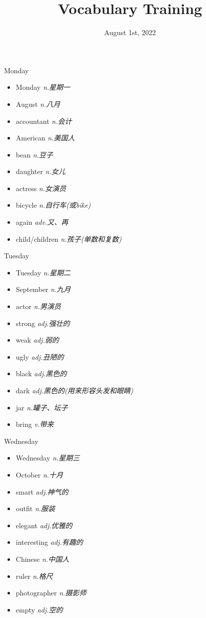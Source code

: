 \documentclass{ctexart}
\title{Vocabulary Training}
\date{August 1st, 2022}
\begin{document}
\maketitle
\begin{multicols}{2}
\begin{textbox}{Monday}
\begin{itemize}
    \item Monday \emph{n.星期一}
    \item August \emph{n.八月}
    \item accountant \emph{n.会计}
    \item American \emph{n.美国人}
    \item bean \emph{n.豆子}
    \item daughter \emph{n.女儿}
    \item actress \emph{n.女演员}
    \item bicycle \emph{n.自行车(或bike)}
    \item again \emph{adv.又、再}
    \item child/children \emph{n.孩子(单数和复数)}
\end{itemize}
\end{textbox}

\begin{textbox}{Tuesday}
\begin{itemize}
    \item Tuesday \emph{n.星期二}
    \item September \emph{n.九月}
    \item actor \emph{n.男演员}
    \item strong \emph{adj.强壮的}
    \item weak \emph{adj.弱的}
    \item ugly \emph{adj.丑陋的}
    \item black \emph{adj.黑色的}
    \item dark \emph{adj.黑色的(用来形容头发和眼睛)}
    \item jar \emph{n.罐子、坛子}
    \item bring \emph{v.带来}
\end{itemize}
\end{textbox}

\begin{textbox}{Wednesday}
\begin{itemize}
    \item Wednesday \emph{n.星期三}
    \item October \emph{n.十月}
    \item smart \emph{adj.神气的}
    \item outfit \emph{n.服装}
    \item elegant \emph{adj.优雅的}
    \item interesting \emph{adj.有趣的}
    \item Chinese \emph{n.中国人}
    \item ruler \emph{n.格尺}
    \item photographer \emph{n.摄影师}
    \item empty \emph{adj.空的}
\end{itemize}
\end{textbox}


\end{multicols}
\end{document}

